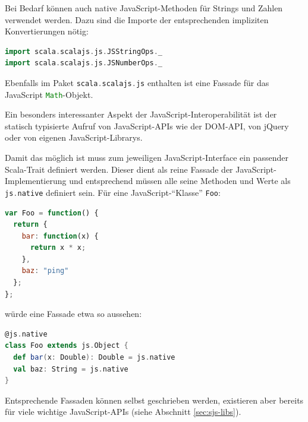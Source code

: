 \documentclass[a4paper, 12pt, hidelinks, listof=totoc, listoftables=totoc, bibliography=totoc]{scrreprt}
\newcommand{\code}[1]{\lstinline[language=Scala, style=inline]|#1|}
\newcommand{\scala}[1]{\lstinline[language=Scala, style=inline]|#1|}
\newcommand{\js}[1]{\lstinline[language=JavaScript, style=inline]|#1|}
\begin{document}
Bei Bedarf können auch native JavaScript-Methoden für Strings und Zahlen verwendet werden. Dazu sind die Importe der entsprechenden impliziten Konvertierungen nötig:
\begin{lstlisting}[language=Scala, style=snippet]
import scala.scalajs.js.JSStringOps._
import scala.scalajs.js.JSNumberOps._
\end{lstlisting}

Ebenfalls im Paket \scala{scala.scalajs.js} enthalten ist eine Fassade für das JavaScript \js{Math}-Objekt.

Ein besonders interessanter Aspekt der JavaScript-Interoperabilität ist der statisch typisierte Aufruf von JavaScript-\ac{API}s wie der \ac{DOM}-\ac{API}, von jQuery oder von eigenen JavaScript-Librarys.

Damit das möglich ist muss zum jeweiligen JavaScript-Interface ein passender Scala-Trait definiert werden. Dieser dient als reine Fassade der JavaScript-Implementierung und entsprechend müssen alle seine Methoden und Werte als \scala{js.native} definiert sein. Für eine JavaScript-"`Klasse"' \code{Foo}:

\begin{lstlisting}[language=JavaScript, style=snippet]
var Foo = function() {
  return {
    bar: function(x) {
      return x * x;
    },
    baz: "ping"
  };
};
\end{lstlisting}

würde eine Fassade etwa so aussehen:

\begin{lstlisting}[language=Scala, style=snippet]
@js.native
class Foo extends js.Object {
  def bar(x: Double): Double = js.native
  val baz: String = js.native
}
\end{lstlisting}

Entsprechende Fassaden können selbst geschrieben werden, existieren aber bereits für viele wichtige JavaScript-\ac{API}s (siehe Abschnitt \ref{sec:sjs-libs}).

%
%
\end{document}
